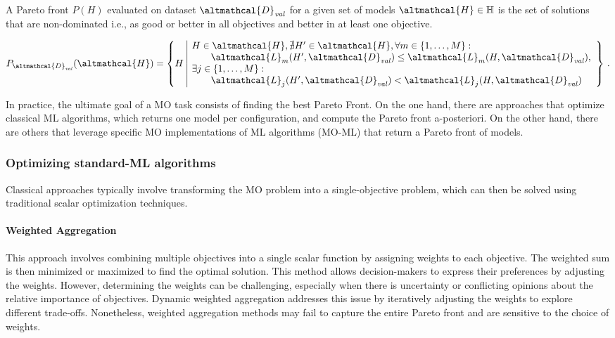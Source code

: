 \begin{definition}
    A Pareto front $P(H)$ evaluated on dataset $\altmathcal{D}_{\mathit{val}}$ for a given set of models $\altmathcal{H} \in \mathbb{H}$ is the set of solutions that are non-dominated i.e., as good or better in all objectives and better in at least one objective.

    \begin{equation*}
        \label{eq:pareto_def}
            P_{\altmathcal{D}_{\mathit{val}}}(\altmathcal{H}) = \left\{ H \,\, \begin{array}{|l}
            H \in \altmathcal{H}, \nexists H' \in \altmathcal{H},
            \forall m \in \{1, \dots, M\} : \\
            \quad\quad\altmathcal{L}_m(H',\altmathcal{D}_{\mathit{val}}) \leq \altmathcal{L}_m(H,\altmathcal{D}_{\mathit{val}}), \\
            \exists j \in \{1, \dots, M\} : \\
            \quad\quad\altmathcal{L}_j(H',\altmathcal{D}_{\mathit{val}}) < \altmathcal{L}_j(H, \altmathcal{D}_{\mathit{val}})
            \end{array}\right\} \, .
        \end{equation*}
\end{definition}

In practice, the ultimate goal of a MO task consists of finding the best Pareto Front.
On the one hand, there are approaches that optimize classical ML algorithms, which returns one model per configuration, and compute the Pareto front a-posteriori.
On the other hand, there are others that leverage specific MO implementations of ML algorithms (MO-ML) that return a Pareto front of models.

\subsubsection{Optimizing standard-ML algorithms}

Classical approaches typically involve transforming the MO problem into a single-objective problem, which can then be solved using traditional scalar optimization techniques.

\paragraph{Weighted Aggregation}
This approach involves combining multiple objectives into a single scalar function by assigning weights to each objective.
The weighted sum is then minimized or maximized to find the optimal solution. This method allows decision-makers to express their preferences by adjusting the weights.
However, determining the weights can be challenging, especially when there is uncertainty or conflicting opinions about the relative importance of objectives. Dynamic weighted aggregation \cite{jin2001dynamic} addresses this issue by iteratively adjusting the weights to explore different trade-offs.
Nonetheless, weighted aggregation methods may fail to capture the entire Pareto front and are sensitive to the choice of weights.

